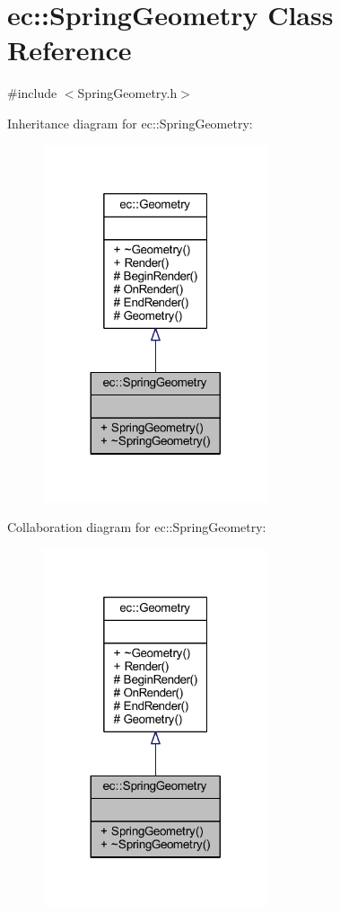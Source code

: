 \hypertarget{classec_1_1_spring_geometry}{}\section{ec\+:\+:Spring\+Geometry Class Reference}
\label{classec_1_1_spring_geometry}


{\ttfamily \#include $<$Spring\+Geometry.\+h$>$}



Inheritance diagram for ec\+:\+:Spring\+Geometry\+:
\nopagebreak
\begin{figure}[H]
\begin{center}
\leavevmode
\includegraphics[width=188pt]{classec_1_1_spring_geometry__inherit__graph}
\end{center}
\end{figure}


Collaboration diagram for ec\+:\+:Spring\+Geometry\+:
\nopagebreak
\begin{figure}[H]
\begin{center}
\leavevmode
\includegraphics[width=188pt]{classec_1_1_spring_geometry__coll__graph}
\end{center}
\end{figure}
